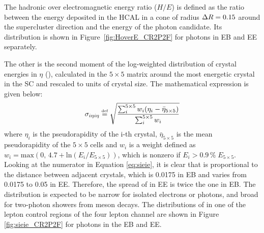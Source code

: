 The hadronic over electromagnetic energy ratio ($H/E$) is defined as the ratio between the energy deposited in the HCAL in a cone of radius $\Delta R = 0.15$
around the supercluster direction and the energy of the photon candidate.
Its distribution is shown in Figure~\ref{fig:HoverE_CR2P2F} for photons in EB and EE separately.

The other is the second moment of the log-weighted distribution of crystal energies in $\eta$ (\sieie),
calculated in the $5 \times 5$ matrix around the most energetic crystal in the SC and rescaled to units of crystal size.
The mathematical expression is given below:
\begin{equation}
\label{eq:sieie}
\sigma_{i \eta i \eta} \stackrel{\text{\tiny def}}{=} \sqrt{ \frac{\sum_i^{5 \times 5} w_i(\eta_i - \bar{\eta}_{5 \times 5})}{\sum_i^{5 \times 5} w_i} }
\end{equation}
where $\eta_i$ is the pseudorapidity of the i-th crystal,
$\bar{\eta}_{5 \times 5}$ is the mean pseudorapidity of the $5 \times 5$ cells
and $w_i$ is a weight defined as $w_i = \mathrm{max}(0,\, 4.7 + \mathrm{ln}(E_i/E_{5 \times 5}))$,
which is nonzero if $E_i > 0.9\, \%\; E_{5 \times 5}$.
Looking at the numerator in Equation \ref{eq:sieie}, it is clear that \sieie is proportional to the distance between adjacent crystals,
which is 0.0175 in EB and varies from 0.0175 to 0.05 in EE.
Therefore, the spread of \sieie in EE is twice the one in EB.
The \sieie distribution is expected to be narrow for isolated electrons or photons, and broad for two-photon showers from meson decays.
The distributions of \sieie in one of the lepton control regions of the four lepton channel
are shown in Figure \ref{fig:sieie_CR2P2F} for photons in the EB and EE.

